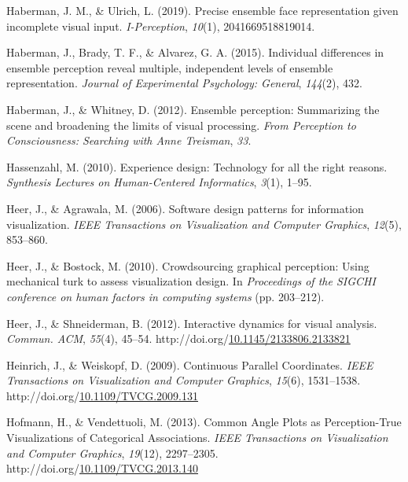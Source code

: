\documentclass[print]{nuthesis}
\newlength{\cslhangindent}
\newenvironment{CSLReferences}[2]%
{\setlength{\parindent}{0pt}%
\everypar{\setlength{\hangindent}{\cslhangindent}}\ignorespaces}%
{\par}
\begin{document}
\begin{CSLReferences}{1}{0}
\leavevmode{}%
Haberman, J. M., \& Ulrich, L. (2019). Precise ensemble face representation given incomplete visual input. \emph{I-Perception}, \emph{10}(1), 2041669518819014.

\leavevmode{}%
Haberman, J., Brady, T. F., \& Alvarez, G. A. (2015). Individual differences in ensemble perception reveal multiple, independent levels of ensemble representation. \emph{Journal of Experimental Psychology: General}, \emph{144}(2), 432.

\leavevmode{}%
Haberman, J., \& Whitney, D. (2012). Ensemble perception: Summarizing the scene and broadening the limits of visual processing. \emph{From Perception to Consciousness: Searching with Anne Treisman}, \emph{33}.

\leavevmode{}%
Hassenzahl, M. (2010). Experience design: Technology for all the right reasons. \emph{Synthesis Lectures on Human-Centered Informatics}, \emph{3}(1), 1--95.

\leavevmode{}%
Heer, J., \& Agrawala, M. (2006). Software design patterns for information visualization. \emph{IEEE Transactions on Visualization and Computer Graphics}, \emph{12}(5), 853--860.

\leavevmode{}%
Heer, J., \& Bostock, M. (2010). Crowdsourcing graphical perception: Using mechanical turk to assess visualization design. In \emph{Proceedings of the SIGCHI conference on human factors in computing systems} (pp. 203--212).

\leavevmode{}%
Heer, J., \& Shneiderman, B. (2012). Interactive dynamics for visual analysis. \emph{Commun. ACM}, \emph{55}(4), 45--54. http://doi.org/\href{https://doi.org/10.1145/2133806.2133821}{10.1145/2133806.2133821}

\leavevmode{}%
Heinrich, J., \& Weiskopf, D. (2009). {Continuous Parallel Coordinates}. \emph{IEEE Transactions on Visualization and Computer Graphics}, \emph{15}(6), 1531--1538. http://doi.org/\href{https://doi.org/10.1109/TVCG.2009.131}{10.1109/TVCG.2009.131}

\leavevmode{}%
Hofmann, H., \& Vendettuoli, M. (2013). {Common Angle Plots as Perception-True Visualizations of Categorical Associations}. \emph{IEEE Transactions on Visualization and Computer Graphics}, \emph{19}(12), 2297--2305. http://doi.org/\href{https://doi.org/10.1109/TVCG.2013.140}{10.1109/TVCG.2013.140}


\end{CSLReferences}
\end{document}
